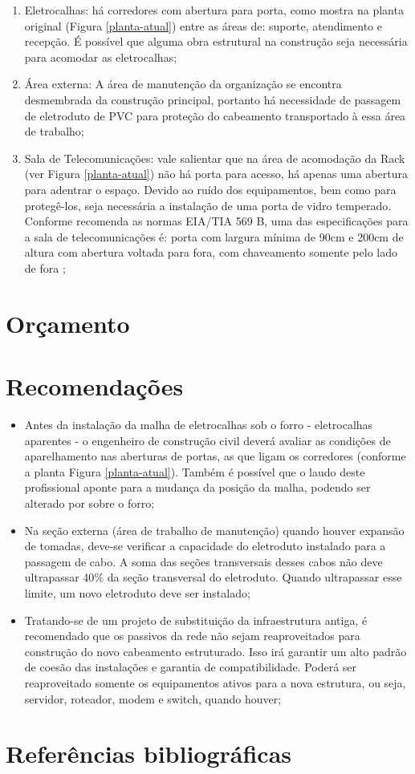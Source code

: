 \documentclass[	DIV=calc,%
							paper=a4,%
							fontsize=12pt,%
							onecolumn]{scrartcl}	 					%
\begin{document}
\begin{enumerate}
	\item Eletrocalhas: há corredores com abertura para porta, como mostra na planta original (Figura \ref{planta-atual}) entre as áreas de: suporte, atendimento e recepção. É possível que alguma obra estrutural na construção seja necessária para acomodar as eletrocalhas;
	\item Área externa: A área de manutenção da organização se encontra desmembrada da construção principal, portanto há necessidade de passagem de eletroduto de PVC para proteção do cabeamento transportado à essa área de trabalho;
	\item Sala de Telecomunicações: vale salientar que na área de acomodação da Rack (ver Figura \ref{planta-atual}) não há porta para acesso, há apenas uma abertura para adentrar o espaço. Devido ao ruído dos equipamentos, bem como para protegê-los, seja necessária a instalação de uma porta de vidro temperado. Conforme recomenda as normas EIA/TIA 569 B, uma das especificações para a sala de telecomunicações é: porta com largura mínima de 90cm e 200cm de altura com abertura voltada para fora, com chaveamento somente pelo lado de fora \cite{senai2012};
\end{enumerate}


\section{Orçamento}

\newpage


\section{Recomendações}

\begin{itemize}
	\item Antes da instalação da malha de eletrocalhas sob o forro - eletrocalhas aparentes - o engenheiro de construção civil deverá avaliar as condições de aparelhamento nas aberturas de portas, as que ligam os corredores (conforme a planta Figura \ref{planta-atual}). Também é possível que o laudo deste profissional aponte para a mudança da posição da malha, podendo ser alterado por sobre o forro;
	\item Na seção externa (área de trabalho de manutenção) quando houver expansão de tomadas, deve-se verificar a capacidade do eletroduto instalado para a passagem de cabo. A soma das seções transversais desses cabos não deve ultrapassar 40$\%$ da seção transversal do eletroduto. Quando ultrapassar esse limite, um novo eletroduto deve ser instalado;
	\item Tratando-se de um projeto de substituição da infraestrutura antiga, é recomendado que os passivos da rede não sejam reaproveitados para construção do novo cabeamento estruturado. Isso irá garantir um alto padrão de coesão das instalações e garantia de compatibilidade. Poderá ser reaproveitado somente os equipamentos ativos para a nova estrutura, ou seja, servidor, roteador, modem e switch, quando houver;
\end{itemize}

\section{Referências bibliográficas}

\renewcommand\refname{} %

  
\end{document}
